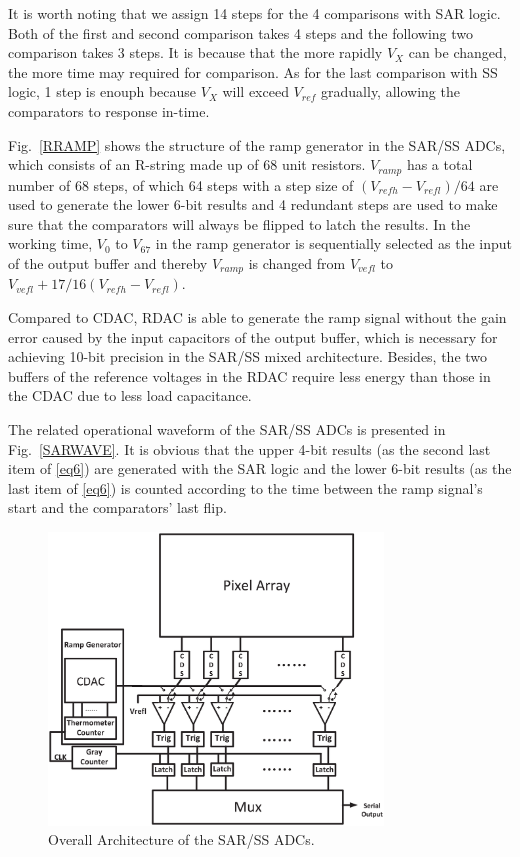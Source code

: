 It is worth noting that we assign 14 steps for the 4 comparisons with SAR logic. Both of the first and second comparison takes 4 steps and the following two comparison takes 3 steps. It is because that the more rapidly $V_{X}$ can be changed, the more time may required for comparison. As for the last comparison with SS logic, 1 step is enouph because $V_{X}$ will exceed $V_{ref}$ gradually, allowing the comparators to response in-time.

Fig.~\ref{RRAMP} shows the structure of the ramp generator in the SAR/SS ADCs, which consists of an R-string made up of 68 unit resistors. $V_{ramp}$ has a total number of 68 steps,
of which 64 steps with a step size of $(V_{refh}-V_{refl})/64$ are used to generate the lower 6-bit results and 4 redundant steps are used to make sure that the comparators 
will always be flipped to latch the results. In the working time, $V_{0}$ to $V_{67}$ in the ramp generator is sequentially selected as the input of the output buffer and thereby 
$V_{ramp}$ is changed from $V_{vefl}$ to $V_{vefl}+17/16(V_{refh}-V_{refl})$.

Compared to CDAC, RDAC is able to generate the ramp signal without the gain error caused by the input capacitors of the output buffer, 
which is necessary for achieving 10-bit precision in the SAR/SS mixed architecture.
Besides, the two buffers of the reference voltages in the RDAC require less energy than those in the CDAC due to less load capacitance.  

The related operational waveform of the SAR/SS ADCs is presented in Fig.~\ref{SARWAVE}. It is obvious that the upper 4-bit results (as the second last item of \eqref{eq6}) are generated 
with the SAR logic and the lower 6-bit results (as the last item of \eqref{eq6}) is counted according to the time between the ramp signal’s start and the comparators’ last flip.

\begin{figure}[htbp]
	\centerline{\includegraphics[width=3.5in]{./Figures/SARADC.eps}}
	\caption{Overall Architecture of the SAR/SS ADCs.}
	\label{SARADC}
\end{figure} 

